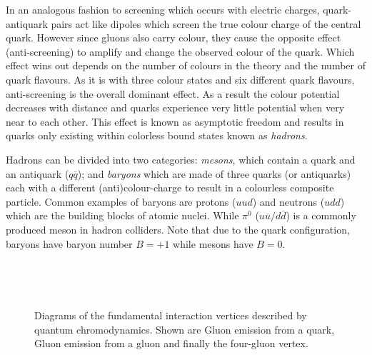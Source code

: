 In an analogous fashion to screening which occurs with electric charges, quark-antiquark pairs act like dipoles which screen the true colour charge of the central quark. However since gluons also carry colour, they cause the opposite effect (anti-screening) to amplify and change the observed colour of the quark. Which effect wins out depends on the number of colours in the theory and the number of quark flavours. As it is with three colour states and six different quark flavours, anti-screening is the overall dominant effect. As a result the colour potential decreases with distance and quarks experience very little potential when very near to each other. This effect is known as asymptotic freedom and results in quarks only existing within colorless bound states known as \textit{hadrons}.

Hadrons can be divided into two categories: \textit{mesons}, which contain a quark and an antiquark ($q\overline{q}$); and \textit{baryons} which are made of three quarks (or antiquarks) each with a different (anti)colour-charge to result in a colourless composite particle. Common examples of baryons are protons ($uud$) and neutrons ($udd$) which are the building blocks of atomic nuclei. While $\pi^{0}$ ($u\overline{u}/d\overline{d}$) is a commonly produced meson in hadron colliders. Note that due to the quark configuration, baryons have baryon number $B=+1$ while mesons have $B=0$.
  
\begin{figure}
  \begin{minipage}[][][t]{.32\textwidth}
    
     \label{fig:TheoryQCDColour}
  \end{minipage}
  \,
  \begin{minipage}[][][t]{.32\textwidth}
    \centering
    
     \label{fig:TheoryQCDThreeGluon}
  \end{minipage}
  \,
  \begin{minipage}[][][t]{.32\textwidth}
    \centering
    
     \label{fig:TheoryQCDFourGluon}
  \end{minipage}  
  \caption{Diagrams of the fundamental interaction vertices described by quantum chromodynamics. Shown are  Gluon emission from a quark,  Gluon emission from a gluon and finally  the four-gluon vertex.} \label{fig:TheoryQCDVertexes}
\end{figure}

